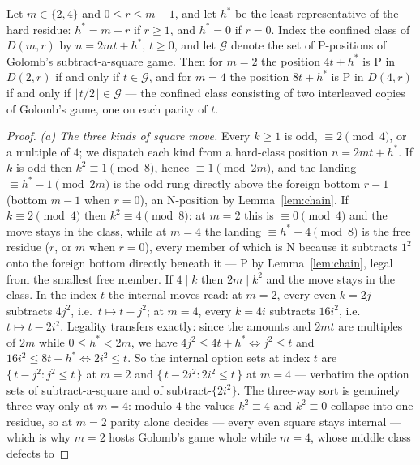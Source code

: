\begin{theorem}\label{thm:golomb}
Let $m \in \{2, 4\}$ and $0 \le r \le m-1$, and let $h^*$ be the least
representative of the hard residue: $h^* = m + r$ if $r \ge 1$, and $h^* = 0$
if $r = 0$. Index the confined class of $D(m,r)$ by $n = 2mt + h^*$,
$t \ge 0$, and let $\mathcal{G}$ denote the set of P-positions of Golomb's
subtract-a-square game. Then for $m = 2$ the position $4t + h^*$ is P in
$D(2,r)$ if and only if $t \in \mathcal{G}$, and for $m = 4$ the position $8t + h^*$
is P in $D(4,r)$ if and only if $\lfloor t/2 \rfloor \in \mathcal{G}$ --- the
confined class consisting of two interleaved copies of Golomb's game, one
on each parity of $t$.
\end{theorem}
\begin{proof}
\emph{(a) The three kinds of square move.} Every $k \ge 1$ is odd,
$\equiv 2 \pmod 4$, or a multiple of $4$; we dispatch each kind from a
hard-class position $n = 2mt + h^*$. If $k$ is odd then $k^2 \equiv 1
\pmod 8$, hence $\equiv 1 \pmod{2m}$, and the landing $\equiv h^* - 1
\pmod{2m}$ is the odd rung directly above the foreign bottom $r - 1$
(bottom $m - 1$ when $r = 0$), an N-position by Lemma~\ref{lem:chain}.
If $k \equiv 2 \pmod 4$ then $k^2 \equiv 4 \pmod 8$: at $m = 2$ this is
$\equiv 0 \pmod 4$ and the move stays in the class, while at $m = 4$ the
landing $\equiv h^* - 4 \pmod 8$ is the free residue ($r$, or $m$ when
$r = 0$), every member of which is N because it subtracts $1^2$ onto the
foreign bottom directly beneath it --- P by Lemma~\ref{lem:chain}, legal
from the smallest free member. If $4 \mid k$ then $2m \mid k^2$ and the
move stays in the class. In the index $t$ the internal moves read: at
$m = 2$, every even $k = 2j$ subtracts $4j^2$, i.e.\ $t \mapsto t - j^2$;
at $m = 4$, every $k = 4i$ subtracts $16i^2$, i.e.\ $t \mapsto t - 2i^2$.
Legality transfers exactly: since the amounts and $2mt$ are multiples of
$2m$ while $0 \le h^* < 2m$, we have $4j^2 \le 4t + h^* \iff j^2 \le t$ and
$16i^2 \le 8t + h^* \iff 2i^2 \le t$. So the internal option sets at index
$t$ are $\{\, t - j^2 : j^2 \le t \,\}$ at $m = 2$ and
$\{\, t - 2i^2 : 2i^2 \le t \,\}$ at $m = 4$ --- verbatim the option sets
of subtract-a-square and of subtract-$\{2i^2\}$. The three-way sort is
genuinely three-way only at $m = 4$: modulo $4$ the values $k^2 \equiv 4$
and $k^2 \equiv 0$ collapse into one residue, so at $m = 2$ parity alone
decides --- every even square stays internal --- which is why $m = 2$
hosts Golomb's game whole while $m = 4$, whose middle class defects to

\end{proof}

